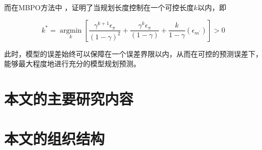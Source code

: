 而在MBPO方法中 \cite{janner2019trust}，证明了当规划长度控制在一个可控长度$k$以内，即

\begin{equation}
k^{*}=\underset{k}{\operatorname{argmin}}\left[\frac{\gamma^{k+1} \epsilon_{\pi}}{(1-\gamma)^{2}}+\frac{\gamma^{k} \epsilon_{\pi}}{(1-\gamma)}+\frac{k}{1-\gamma}\left(\epsilon_{m^{\prime}}\right)\right]>0
\end{equation}

此时，模型的误差始终可以保障在一个误差界限以内，从而在可控的预测误差下，能够最大程度地进行充分的模型规划预测。


\section{本文的主要研究内容}

\section{本文的组织结构}